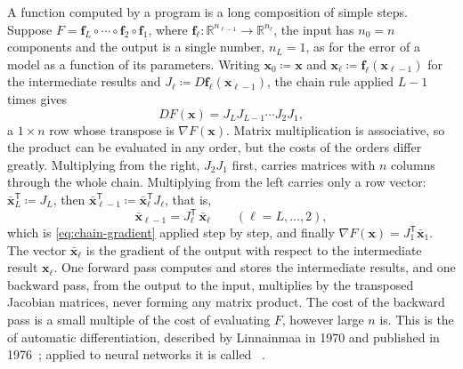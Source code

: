 A function computed by a program is a long composition of simple steps. Suppose $F=\mathbf f_L\circ\cdots\circ\mathbf f_2\circ\mathbf f_1$, where $\mathbf f_\ell\colon\mathbb R^{n_{\ell-1}}\to\mathbb R^{n_\ell}$, the input has $n_0=n$ components and the output is a single number, $n_L=1$, as for the error of a model as a function of its parameters. Writing $\mathbf x_0\coloneqq\mathbf x$ and $\mathbf x_\ell\coloneqq\mathbf f_\ell(\mathbf x_{\ell-1})$ for the intermediate results and $J_\ell\coloneqq D\mathbf f_\ell(\mathbf x_{\ell-1})$, the chain rule applied $L-1$ times gives
\[
DF(\mathbf x)=J_LJ_{L-1}\cdots J_2J_1 ,
\]
a $1\times n$ row whose transpose is $\nabla F(\mathbf x)$. Matrix multiplication is associative, so the product can be evaluated in any order, but the costs of the orders differ greatly. Multiplying from the right, $J_2J_1$ first, carries matrices with $n$ columns through the whole chain. Multiplying from the left carries only a row vector: $\bar{\mathbf x}_L^{\mathsf T}\coloneqq J_L$, then $\bar{\mathbf x}_{\ell-1}^{\mathsf T}\coloneqq\bar{\mathbf x}_\ell^{\mathsf T}J_\ell$, that is,
\[
\bar{\mathbf x}_{\ell-1}=J_\ell^{\mathsf T}\,\bar{\mathbf x}_\ell\qquad(\ell=L,\ldots,2),
\]
which is \eqref{eq:chain-gradient} applied step by step, and finally $\nabla F(\mathbf x)=J_1^{\mathsf T}\bar{\mathbf x}_1$. The vector $\bar{\mathbf x}_\ell$ is the gradient of the output with respect to the intermediate result $\mathbf x_\ell$. One forward pass computes and stores the intermediate results, and one backward pass, from the output to the input, multiplies by the transposed Jacobian matrices, never forming any matrix product. The cost of the backward pass is a small multiple of the cost of evaluating $F$, however large $n$ is. This is the  of automatic differentiation, described by Linnainmaa in 1970 and published in 1976~\cite{linnainmaa1976,griewank2008}; applied to neural networks it is called ~\cite{rumelhart1986}.

